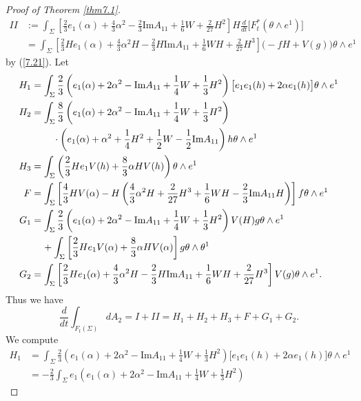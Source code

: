 \documentclass{amsart}
\theoremstyle{Corollary}
\numberwithin{equation}{section}
\begin{document}
\begin{proof}[Proof of Theorem \ref{thm7.1}]
\begin{equation*}
\begin{split}
II&:=\int_\Sigma\left[\frac{2}{3}e_1(\alpha)+\frac{4}{3}\alpha^2-\frac{2}{3}\mbox{Im} A_{11}
+\frac{1}{6}W+\frac{2}{27}H^2\right]H\frac{d}{dt}\big[F_t^*(\theta\wedge e^1)\big]\\
&=\int_\Sigma\left[\frac{2}{3}He_1(\alpha)+\frac{4}{3}\alpha^2H-\frac{2}{3}H\mbox{Im} A_{11}
+\frac{1}{6}WH+\frac{2}{27}H^3\right]
\big(-fH+V(g)\big)\theta\wedge e^1
\end{split}
\end{equation*}
by (\ref{7.21}). 
Let 
\begin{align*}
H_1&=\int_\Sigma\frac{2}{3}\left(e_1(\alpha)+2\alpha^2-\mbox{Im} A_{11}+\frac{1}{4}W+\frac{1}{3}H^2\right)
\big[e_1e_1(h)+2\alpha e_1(h)\big]\theta\wedge e^1\\
H_2&=\int_\Sigma\frac{8}{3}\left(e_1(\alpha)+2\alpha^2-\mbox{Im} A_{11}+\frac{1}{4}W+\frac{1}{3}H^2\right)\\
&\hspace{8mm}\cdot
\left(e_1(\alpha)+\alpha^2+\frac{1}{4}H^2+\frac{1}{2}W-\frac{1}{2}\mbox{Im}A_{11}\right)h \theta\wedge e^1\\
H_3&=\int_\Sigma\left(\frac{2}{3}H e_1V(h)+\frac{8}{3}\alpha H V(h)\right)\theta\wedge e^1\\
F&=\int_\Sigma\left[\frac{4}{3}HV(\alpha)-H\left(\frac{4}{3}\alpha^2H+\frac{2}{27}H^3
+\frac{1}{6}WH-\frac{2}{3}\mbox{Im}A_{11}H\right)\right]f\theta\wedge e^1\\
G_1&=\int_\Sigma\frac{2}{3} \left(e_1(\alpha)+2\alpha^2-\mbox{Im} A_{11}+\frac{1}{4}W+\frac{1}{3}H^2\right)
V(H)g\theta\wedge e^1\\
&\hspace{4mm}+\int_\Sigma\left[\frac{2}{3}He_1V(\alpha)+\frac{8}{3}\alpha H V(\alpha)\right]g\theta\wedge \theta^1\\
G_2&=\int_\Sigma
\left[\frac{2}{3}He_1(\alpha)+\frac{4}{3}\alpha^2H-\frac{2}{3}H\mbox{Im} A_{11}
+\frac{1}{6}WH+\frac{2}{27}H^3\right]
 V(g) \theta\wedge e^1.
\end{align*}
Thus we have 
\begin{equation}\label{7.36}
\frac{d}{dt}\int_{F_t(\Sigma)}dA_2
=I+II=H_1+H_2+H_3+F+G_1+G_2.
\end{equation}
We compute 
\begin{align*}
H_1&=\int_\Sigma\frac{2}{3}\left(e_1(\alpha)+2\alpha^2-\mbox{Im} A_{11}+\frac{1}{4}W+\frac{1}{3}H^2\right)
\big[e_1e_1(h)+2\alpha e_1(h)\big]\theta\wedge e^1\\
&=-\frac{2}{3}\int_\Sigma e_1\left(e_1(\alpha)+2\alpha^2-\mbox{Im} A_{11}+\frac{1}{4}W+\frac{1}{3}H^2\right)

\end{align*}
\end{proof}
\end{document}
